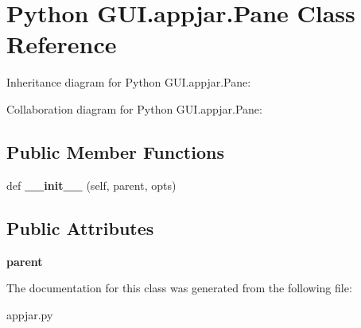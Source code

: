 \hypertarget{class_python_01_g_u_i_1_1appjar_1_1_pane}{}\section{Python G\+U\+I.\+appjar.\+Pane Class Reference}
\label{class_python_01_g_u_i_1_1appjar_1_1_pane}


Inheritance diagram for Python G\+U\+I.\+appjar.\+Pane\+:


Collaboration diagram for Python G\+U\+I.\+appjar.\+Pane\+:
\subsection*{Public Member Functions}
\begin{DoxyCompactItemize}
\item 
\mbox{\label{class_python_01_g_u_i_1_1appjar_1_1_pane_a5da1c2056556835da552d2c5a21f4e8a}} 
def {\bfseries \+\_\+\+\_\+init\+\_\+\+\_\+} (self, parent, opts)
\end{DoxyCompactItemize}
\subsection*{Public Attributes}
\begin{DoxyCompactItemize}
\item 
\mbox{\label{class_python_01_g_u_i_1_1appjar_1_1_pane_a8a15748f0a6f4b6e494babf828d13a19}} 
{\bfseries parent}
\end{DoxyCompactItemize}


The documentation for this class was generated from the following file\+:\begin{DoxyCompactItemize}
\item 
appjar.\+py\end{DoxyCompactItemize}
